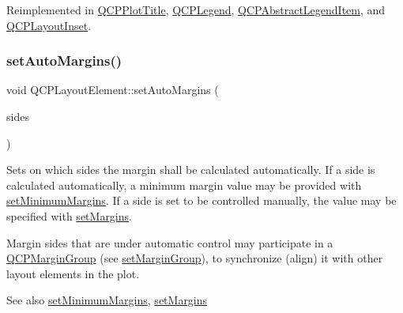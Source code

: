 Reimplemented in \mbox{\hyperlink{class_q_c_p_plot_title_aae4bcb2401e6947ea0abd3c960488d35}{Q\+C\+P\+Plot\+Title}}, \mbox{\hyperlink{class_q_c_p_legend_acd7be544c81324e391cfa6be9c413c01}{Q\+C\+P\+Legend}}, \mbox{\hyperlink{class_q_c_p_abstract_legend_item_ac834bf9003c491e5064a31e2a7de418d}{Q\+C\+P\+Abstract\+Legend\+Item}}, and \mbox{\hyperlink{class_q_c_p_layout_inset_afcd56d5d1b8853838cdc535f1904f68a}{Q\+C\+P\+Layout\+Inset}}.

\mbox{\label{class_q_c_p_layout_element_accfda49994e3e6d51ed14504abf9d27d}} 
\subsubsection{\texorpdfstring{set\+Auto\+Margins()}{setAutoMargins()}}
{\footnotesize\ttfamily void Q\+C\+P\+Layout\+Element\+::set\+Auto\+Margins (\begin{DoxyParamCaption}\item[{Q\+C\+P\+::\+Margin\+Sides}]{sides }\end{DoxyParamCaption})}

Sets on which sides the margin shall be calculated automatically. If a side is calculated automatically, a minimum margin value may be provided with \mbox{\hyperlink{class_q_c_p_layout_element_a0a8a17abc16b7923159fcc7608f94673}{set\+Minimum\+Margins}}. If a side is set to be controlled manually, the value may be specified with \mbox{\hyperlink{class_q_c_p_layout_element_a8f450b1f3f992ad576fce2c63d8b79cf}{set\+Margins}}.

Margin sides that are under automatic control may participate in a \mbox{\hyperlink{class_q_c_p_margin_group}{Q\+C\+P\+Margin\+Group}} (see \mbox{\hyperlink{class_q_c_p_layout_element_a516e56f76b6bc100e8e71d329866847d}{set\+Margin\+Group}}), to synchronize (align) it with other layout elements in the plot.

\begin{DoxySeeAlso}{See also}
\mbox{\hyperlink{class_q_c_p_layout_element_a0a8a17abc16b7923159fcc7608f94673}{set\+Minimum\+Margins}}, \mbox{\hyperlink{class_q_c_p_layout_element_a8f450b1f3f992ad576fce2c63d8b79cf}{set\+Margins}} 
\end{DoxySeeAlso}
\mbox{\label{class_q_c_p_layout_element_a516e56f76b6bc100e8e71d329866847d}} 
